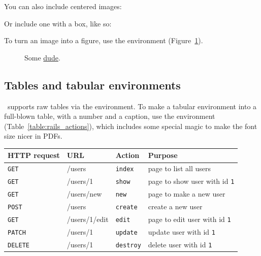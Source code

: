 \noindent You can also include centered images:


\noindent Or include one with a box, like so:


To turn an image into a figure, use the  environment (Figure~\ref{fig:the_dude}).

\begin{figure}
\caption{Some \href{http://michaelhartl.com/}{dude}.\label{fig:the_dude}}
\end{figure}

\subsection{Tables and tabular environments}
\label{tables_and_tabular}

\PolyTeXnic\ supports raw tables via the  environment. To make a tabular environment into a full-blown table, with a number and a caption, use the  environment (Table~\ref{table:rails_actions}), which includes some special magic to make the font size nicer in PDFs.

\bigskip

\begin{tabular}{llll}
\textbf{HTTP request} & \textbf{URL} & \textbf{Action} & \textbf{Purpose} \\ \hline

\texttt{GET} & /users & \texttt{index} & page to list all users \\
\texttt{GET} & /users/1 & \texttt{show} & page to show user with id \texttt{1}\\
\texttt{GET} & /users/new & \texttt{new} & page to make a new user \\
\texttt{POST} & /users & \texttt{create} & create a new user \\
\texttt{GET} & /users/1/edit & \texttt{edit} & page to edit user with id \texttt{1} \\
\texttt{PATCH} & /users/1 & \texttt{update} & update user with id \texttt{1}  \\
\texttt{DELETE} & /users/1 & \texttt{destroy} & delete user with id \texttt{1}
\end{tabular}

